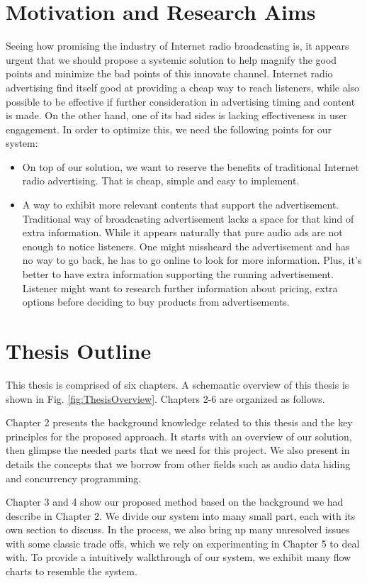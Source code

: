 \section {Motivation and Research Aims}

Seeing how promising the industry of Internet radio broadcasting is, it appears urgent that we should propose a systemic solution to help magnify the good points and minimize the bad points of this innovate channel. Internet radio advertising find itself good at providing a cheap way to reach listeners, while also possible to be effective if further consideration in advertising timing and content is made. On the other hand, one of its bad sides is lacking effectiveness in user engagement. In order to optimize this, we need the following points for our system:
\begin{itemize}
\item{On top of our solution, we want to reserve the benefits of traditional Internet radio advertising. That is cheap, simple and easy to implement.}
\item{A way to exhibit more relevant contents that support the advertisement. Traditional way of broadcasting advertisement lacks a space for that kind of extra information. While it appears naturally that pure audio ads are not enough to notice listeners. One might missheard the advertisement and has no way to go back, he has to go online to look for more information. Plus, it's better to have extra information supporting the running advertisement. Listener might want to research further information about pricing, extra options before deciding to buy products from advertisements.}
\end{itemize}

\section {Thesis Outline}
This thesis is comprised of six chapters. A schemantic overview of this thesis is shown in Fig. \ref{fig:ThesisOverview}. Chapters 2-6 are organized as follows.

Chapter 2 presents the background knowledge related to this thesis and the key principles for the proposed approach. It starts with an overview of our solution, then glimpse the needed parts that we need for this project. We also present in details the concepts that we borrow from other fields such as audio data hiding and concurrency programming.

Chapter 3  and 4 show our proposed method based on the background we had describe in Chapter 2. We divide our system into many small part, each with its own section to discuss. In the process, we also bring up many unresolved issues with some classic trade offs, which we rely on experimenting in Chapter 5 to deal with. To provide a intuitively walkthrough of our system, we exhibit many flow charts to resemble the system.

